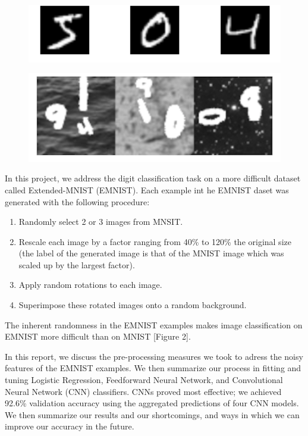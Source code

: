\documentclass[letterpaper, 10 pt, conference]{ieeeconf}  %
\begin{document}
\begin{figure}[ht]
\centering
\begin{minipage}{.5\textwidth}
  \centering
  \includegraphics[width=1\linewidth]{mnist_sample}
  \label{fig:test1}
\end{minipage}%
\begin{minipage}{.5\textwidth}
  \centering
  \includegraphics[width=1\linewidth]{emnist_sample}
  \label{fig:test2}
\end{minipage}
\end{figure}

In this project, we address the digit classification task on a more difficult dataset called Extended-MNIST (EMNIST). Each example int he EMNIST daset was generated with the following procedure:
\begin{enumerate}
\item Randomly select 2 or 3 images from MNSIT.
\item Rescale each image by a factor ranging from 40\% to 120\% the original size (the label of the generated image is that of the MNIST image which was scaled up by the largest factor).
\item Apply random rotations to each image. 
\item Superimpose these rotated images onto a random background.
\end{enumerate}

The inherent randomness in the EMNIST examples makes image classification on EMNIST more difficult than on MNIST [Figure 2]. 

In this report, we discuss the pre-processing measures we took to adress the noisy features of the EMNIST examples. We then summarize our process in fitting and tuning Logistic Regression, Feedforward Neural Network, and Convolutional Neural Network (CNN) classifiers. CNNs proved most effective; we achieved 92.6\% validation accuracy using the aggregated predictions of four CNN models. We then summarize our results and our shortcomings, and ways in which we can improve our accuracy in the future. 
\end{document}
